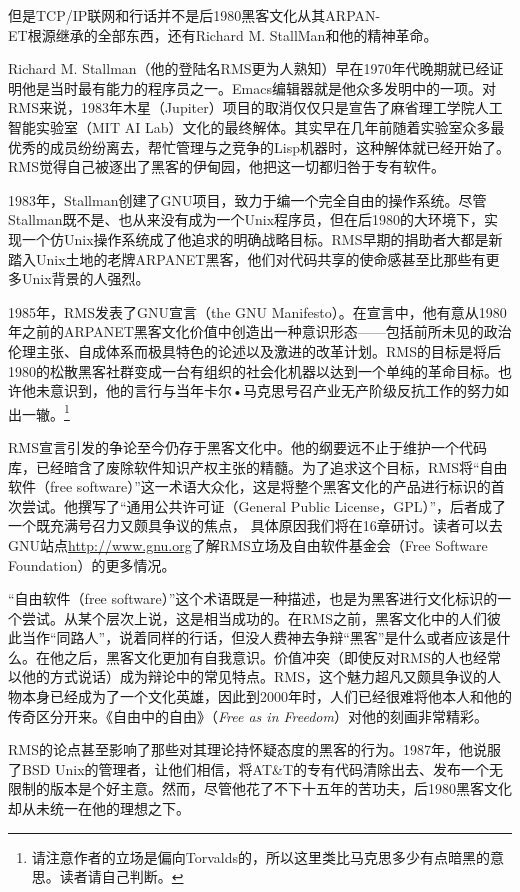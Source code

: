\documentclass[12pt,oneside]{book}
\begin{document}
\begin{common-format}
但是TCP/IP联网和行话并不是后1980黑客文化从其ARPAN-\\ET根源继承的全部东西，还有Richard M. StallMan和他的精神革命。

Richard M. Stallman（他的登陆名RMS更为人熟知）早在1970年代晚期就已经证明他是当时最有能力的程序员之一。Emacs编辑器就是他众多发明中的一项。对RMS来说，1983年木星（Jupiter）项目的取消仅仅只是宣告了麻省理工学院人工智能实验室（MIT AI Lab）文化的最终解体。其实早在几年前随着实验室众多最优秀的成员纷纷离去，帮忙管理与之竞争的Lisp机器时，这种解体就已经开始了。RMS觉得自己被逐出了黑客的伊甸园，他把这一切都归咎于专有软件。

1983年，Stallman创建了GNU项目，致力于编一个完全自由的操作系统。尽管Stallman既不是、也从来没有成为一个Unix程序员，但在后1980的大环境下，实现一个仿Unix操作系统成了他追求的明确战略目标。RMS早期的捐助者大都是新踏入Unix土地的老牌ARPANET黑客，他们对代码共享的使命感甚至比那些有更多Unix背景的人强烈。

1985年，RMS发表了GNU宣言（the GNU Manifesto）。在宣言中，他有意从1980年之前的ARPANET黑客文化价值中创造出一种意识形态——包括前所未见的政治伦理主张、自成体系而极具特色的论述以及激进的改革计划。RMS的目标是将后1980的松散黑客社群变成一台有组织的社会化机器以达到一个单纯的革命目标。也许他未意识到，他的言行与当年卡尔•马克思号召产业无产阶级反抗工作的努力如出一辙。\footnote{请注意作者的立场是偏向Torvalds的，所以这里类比马克思多少有点暗黑的意思。读者请自己判断。}

RMS宣言引发的争论至今仍存于黑客文化中。他的纲要远不止于维护一个代码库，已经暗含了废除软件知识产权主张的精髓。为了追求这个目标，RMS将“自由软件（free software）”这一术语大众化，这是将整个黑客文化的产品进行标识的首次尝试。他撰写了“通用公共许可证（General Public License，GPL）”，后者成了一个既充满号召力又颇具争议的焦点，  具体原因我们将在16章研讨。读者可以去GNU站点\href{http://www.gnu.org}{http://www.gnu.org}了解RMS立场及自由软件基金会（Free Software Foundation）的更多情况。

“自由软件（free  software）”这个术语既是一种描述，也是为黑客进行文化标识的一个尝试。从某个层次上说，这是相当成功的。在RMS之前，黑客文化中的人们彼此当作“同路人”，说着同样的行话，但没人费神去争辩“黑客”是什么或者应该是什么。在他之后，黑客文化更加有自我意识。价值冲突（即使反对RMS的人也经常以他的方式说话）成为辩论中的常见特点。RMS，这个魅力超凡又颇具争议的人物本身已经成为了一个文化英雄，因此到2000年时，人们已经很难将他本人和他的传奇区分开来。《自由中的自由》（\textit{Free as in Freedom}）\cite{Williams}对他的刻画非常精彩。

RMS的论点甚至影响了那些对其理论持怀疑态度的黑客的行为。1987年，他说服了BSD Unix的管理者，让他们相信，将AT\&{}T的专有代码清除出去、发布一个无限制的版本是个好主意。然而，尽管他花了不下十五年的苦功夫，后1980黑客文化却从未统一在他的理想之下。


\end{common-format}
\end{document}
